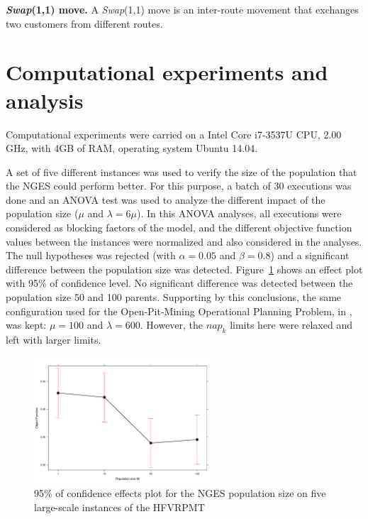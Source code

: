\documentclass{endm}
\begin{document}
%

\textbf{\textit{Swap}(1,1) move.} A \textit{Swap}(1,1) move is an inter-route movement that exchanges two customers from different routes.


\section{Computational experiments and analysis} \label{subSec:HFVRP:Results}

Computational experiments were carried on a Intel Core i7-3537U CPU, 2.00 GHz, with 4GB of RAM, operating system Ubuntu 14.04.

A set of five different instances was used to verify the size of the population that the NGES could perform better.
For this purpose, a batch of 30 executions was done and an ANOVA test was used to analyze the different impact of the population size ($\mu$ and $\lambda = 6\mu$).
In this ANOVA analyses, all executions were considered as blocking factors of the model, and the different objective function values between the instances were normalized and also considered in the analyses.
The null hypotheses was rejected (with $\alpha = 0.05$ and $\beta = 0.8$) and a significant difference between the population size was detected.
Figure~\ref{fig:Effects_MI_FO} shows an effect plot with 95\% of confidence level.
No significant difference was detected between the population size 50 and 100 parents.
Supporting by this conclusions, the same configuration used for the Open-Pit-Mining Operational Planning Problem, in \cite{Coelho2016MIT}, was kept:  $\mu = 100$ and $\lambda=600$.
However, the $nap_k$ limits here were relaxed and left with larger limits.

\begin{figure}[htbp]
	\center
 	\includegraphics[width=0.6\textwidth]{./figs/HFVRP/Effects_MI_FO.pdf}
	\caption{95\% of confidence effects plot for the NGES population size on five large-scale instances of the HFVRPMT} 
	\label{fig:Effects_MI_FO}
\end{figure}
\end{document}
